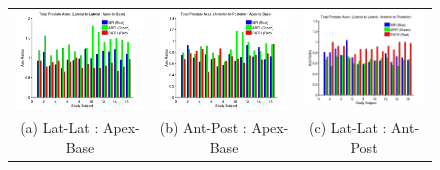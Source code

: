 \begin{figure}[htb!]
\centering
\begin{tabular}{ccc}
\includegraphics[width=0.3\linewidth]{figs/mr_arfi_total_axes1} &
\includegraphics[width=0.3\linewidth]{figs/mr_arfi_total_axes2} &
\includegraphics[width=0.3\linewidth]{figs/mr_arfi_total_axes3} \\
(a) Lat-Lat : Apex-Base & (b) Ant-Post : Apex-Base & (c) Lat-Lat : Ant-Post \\
\end{tabular}
\label{fig:mr_arfi_total_axes} 
\end{figure}
